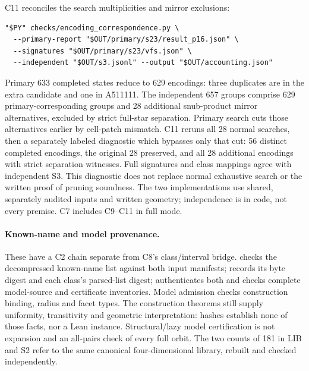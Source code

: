 \documentclass[11pt]{article}
\theoremstyle{definition}
\theoremstyle{remark}
\newcommand{\file}[1]{\path{#1}}
\begin{document}
C11 reconciles the search multiplicities and mirror exclusions:
\begin{verbatim}
"$PY" checks/encoding_correspondence.py \
  --primary-report "$OUT/primary/s23/result_p16.json" \
  --signatures "$OUT/primary/s23/vfs.json" \
  --independent "$OUT/s3.jsonl" --output "$OUT/accounting.json"
\end{verbatim}
Primary 633 completed states reduce to 629 encodings: three duplicates
are in the extra candidate and one in A511111. The independent 657 groups
comprise 629 primary-corresponding groups and 28 additional snub-product
mirror alternatives, excluded by strict full-star separation. Primary
search cuts those alternatives earlier by cell-patch mismatch.
C11 reruns all 28 normal searches, then a separately labeled diagnostic
which bypasses only that cut: 56 distinct completed encodings, the original
28 preserved, and all 28 additional encodings with strict separation
witnesses. Full signatures and class mappings agree with independent S3.
This diagnostic does not replace normal exhaustive search or the written
proof of pruning soundness. The two implementations use shared, separately
audited inputs and written geometry; independence is in code, not every
premise. C7 includes C9--C11 in full mode.

\paragraph{Known-name and model provenance.}
These have a C2 chain separate from C8's class/interval bridge.
\file{unpack_inputs.py} checks the decompressed known-name list against
both input manifests; \file{stage3.py} records its byte digest and each
class's parsed-list digest; \file{audit_stage3.py} authenticates both
and checks complete model-source and certificate inventories. Model
admission checks construction binding, radius and facet types.
The construction theorems still supply uniformity, transitivity and
geometric interpretation: hashes establish none of those facts, nor a
Lean instance. Structural/lazy model certification is not expansion and
an all-pairs check of every full orbit. The two counts of 181 in LIB and
S2 refer to the same canonical four-dimensional library, rebuilt and
checked independently.
\end{document}
